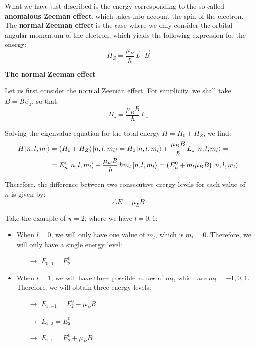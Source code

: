 What we have just described is the energy corresponding to the so called \textbf{anomalous Zeeman effect}, which takes into account the spin of the electron. The \textbf{normal Zeeman effect} is the case where we only consider the orbital angular momentum of the electron, which yields the following expression for the energy:
\begin{equation}
    H_Z = \frac{\mu_B}{\hbar}\,\vec{L}\cdot \vec{B}
\end{equation}

\textbf{The normal Zeeman effect}

Let us first consider the normal Zeeman effect. For simplicity, we shall take $\vec{B} = B\vec{e}_z$, so that:
\begin{equation}
    H_z = \frac{\mu_B B}{\hbar}\,L_z
\end{equation}

Solving the eigenvalue equation for the total energy $H = H_0+H_Z$, we find:
\begin{equation}
    \begin{split}
        H\ket{n,l,m_l} &= (H_0+H_Z)\ket{n,l,m_l} = H_0\ket{n,l,m_l} + \frac{\mu_B B}{\hbar}\,L_z\ket{n,l,m_l} = \\
        &= E_n^0\ket{n,l,m_l} + \frac{\mu_B B}{\hbar}\,\hbar m_l\ket{n,l,m_l} = \left( E_n^0 + m_l\mu_B B \right)\ket{n,l,m_l}
    \end{split}
\end{equation}

Therefore, the difference between two consecutive energy levels for each value of $n$ is given by:
\begin{equation}
    \Delta E = \mu_B B
\end{equation}

Take the example of $n=2$, where we have $l = 0, 1$:
\begin{itemize}
    \item When $l=0$, we will only have one value of $m_l$, which is $m_l = 0$. Therefore, we will only have a single energy level:
    \begin{itemize}
        \item[$\to$] $E_{0,0} = E_2^0$
    \end{itemize}
    \item When $l=1$, we will have three possible values of $m_l$, which are $m_l = -1, 0, 1$. Therefore, we will obtain three energy levels:
    \begin{itemize}
        \item[$\to$] $E_{1,-1} = E_2^0 - \mu_B B$
        \item[$\to$] $E_{1,0} = E_2^0$
        \item[$\to$] $E_{1,1} = E_2^0 + \mu_B B$
    \end{itemize}
\end{itemize}


